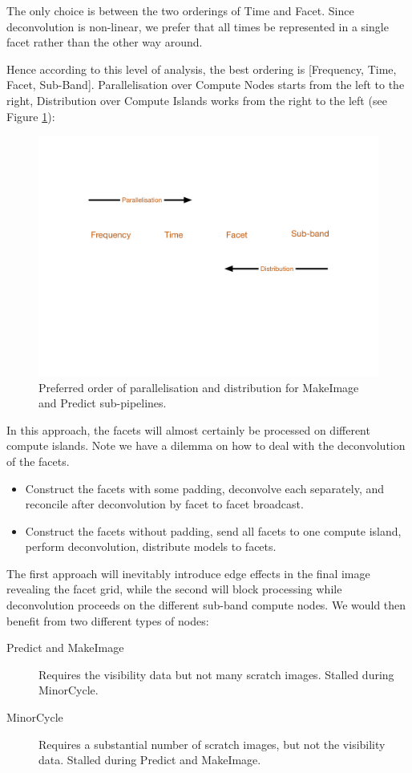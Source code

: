 \documentclass[11pt,a4paper]{article}
\begin{document}
The only choice is between the two orderings of Time and Facet. Since deconvolution is non-linear, we prefer that all times be represented in a single facet rather than the other way around.

Hence according to this level of analysis, the best ordering is [Frequency, Time, Facet, Sub-Band]. Parallelisation over Compute Nodes starts from the left to the right, Distribution over Compute Islands works from the right to the left (see Figure \ref{fig:order}):

\begin{figure}[htb]
  \centering
  \includegraphics[width=\textwidth]{./Order.pdf}
  \caption{Preferred order of parallelisation and distribution for MakeImage and Predict sub-pipelines.}
  \label{fig:order}
\end{figure}

In this approach, the facets will almost certainly be processed on different compute islands. Note we have a dilemma on how to deal with the deconvolution of the facets.

\begin{itemize}	
\item Construct the facets with some padding, deconvolve each separately, and reconcile after deconvolution by facet to facet broadcast.
\item Construct the facets without padding, send all facets to one compute island, perform deconvolution, distribute models to facets. 
\end{itemize}

The first approach will inevitably introduce edge effects in the final image revealing the facet grid, while the second will block processing while deconvolution proceeds on the different sub-band compute nodes. We would then benefit from two different types of nodes:
\begin{description}
\item[Predict and MakeImage] Requires the visibility data but not many scratch images. Stalled during MinorCycle.
\item[MinorCycle] Requires a substantial number of scratch images, but not the visibility data. Stalled during Predict and MakeImage.	
\end{description}
\end{document}
